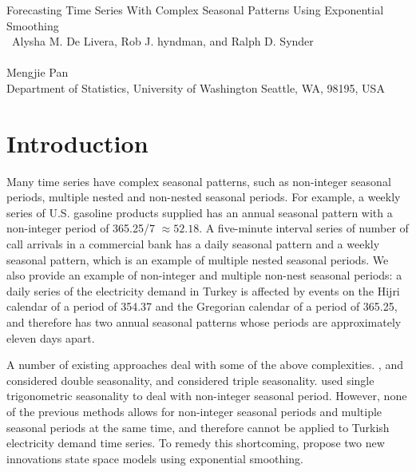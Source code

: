 \documentclass{uwstat572}
\begin{document}

\begin{center}
  {\LARGE Forecasting Time Series With Complex Seasonal Patterns Using Exponential Smoothing  }\\\ 
  {\large Alysha M. De Livera, Rob J. hyndman, and Ralph D. Synder}\\\ \\
  {Mengjie Pan \\ 
    Department of Statistics, University of Washington Seattle, WA, 98195, USA
  }
\end{center}



\section{Introduction}

\hspace{4ex}Many time series have complex seasonal patterns, such as non-integer seasonal periods, multiple nested and non-nested seasonal periods. For example, a weekly series of U.S. gasoline products supplied has an annual seasonal pattern with a non-integer period of 365.25/7 $\approx 52.18$. A five-minute interval series of number of call arrivals in a commercial bank has a daily seasonal pattern and a weekly seasonal pattern, which is an example of multiple nested seasonal periods. We also provide an example of non-integer and multiple non-nest seasonal periods: a daily series of the electricity demand in Turkey is affected by events on the Hijri calendar of a period of 354.37 and the Gregorian calendar of a period of 365.25, and therefore has two annual seasonal patterns whose periods are approximately eleven days apart. 

A number of existing approaches deal with some of the above complexities. \citet{pedregal2006modulated}, \citet{harvey1993forecasting} and \citet{taylor2003short} considered double seasonality, and \citet{taylor2010triple} considered triple seasonality. \citet{harvey1997modeling} used single trigonometric seasonality to deal with non-integer seasonal period. However, none of the previous methods allows for non-integer seasonal periods and multiple seasonal periods at the same time, and therefore cannot be applied to Turkish electricity demand time series. To remedy this shortcoming, \citet{de2011forecasting} propose two new innovations state space models using exponential smoothing. 
\end{document}
